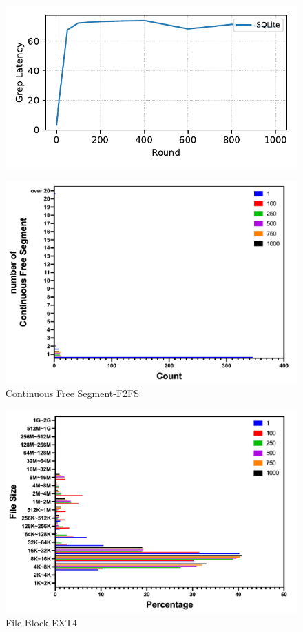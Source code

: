 \begin{figure}[t]
    \centering
    \includegraphics[width=0.95\columnwidth]{graphs/py_graph/latency-f2fs}
    \caption{}
    \label{f:f2fs_latency}
\end{figure}


\begin{figure}[t]
    \centering
	\includegraphics[width=0.95\columnwidth]{graphs/continuous_free_segment_fsfs}
	\caption{Continuous Free Segment-F2FS}
	\label{f:continuous_free_segment_fsfs}
\end{figure}


\begin{figure}[t]
    \centering
	\includegraphics[width=0.95\columnwidth]{graphs/file_block_ext4}
	\caption{File Block-EXT4}
	\label{f:file_block_ext4}
\end{figure}

